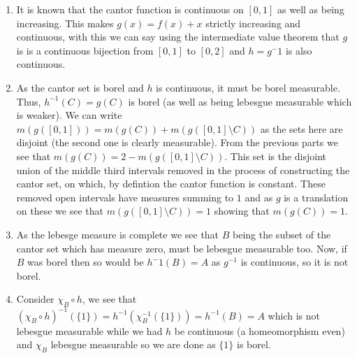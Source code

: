 \documentclass[12pt,a4paper]{article}
\begin{document}
\begin{solution}
\begin{enumerate}[label=\alph*.]
    \item It is known that the cantor function is continuous on $[0,1]$ as well as being increasing. 
    This makes $g(x)=f(x)+x$ strictly increasing and continuous, with this we can say using the intermediate value theorem that $g$ is is a continuous bijection from $[0,1]$ to $[0,2]$ and $h=g^-1$ is also continuous. 
    \item As the cantor set is borel and $h$ is continuous, it must be borel measurable. 
    Thus, $h^{-1}(C)=g(C)$ is borel (as well as being lebesgue measurable which is weaker). 
    We can write $m(g([0,1]))=m(g(C))+m(g([0,1]\setminus C))$ as the sets here are disjoint (the second one is clearly measurable). 
    From the previous parts we see that $m(g(C))=2-m(g([0,1]\setminus C))$. 
    This set is the disjoint union of the middle third intervals removed in the process of constructing the cantor set, on which, by defintion the cantor function is constant. 
    These removed open intervals have measures summing to $1$ and as $g$ is a translation on these we see that $m(g([0,1]\setminus C))=1$ showing that $m(g(C))=1$. 
    \item As the lebesge measure is complete we see that $B$ being the subset of the cantor set which has measure zero, must be lebesgue measurable too. 
    Now, if $B$ was borel then so would be $h^-1(B)=A$ as $g^{-1}$ is continuous, so it is not borel. 
    \item Consider $\chi_{B}\circ h$, we see that $(\chi_B\circ h)^{-1}(\{1\})=h^{-1}(\chi_B^{-1}(\{1\}))=h^{-1}(B)=A$ which is not lebesgue measurable while we had $h$ be continuous (a homeomorphism even) and $\chi_B$ lebesgue measurable so we are done as $\{1\}$ is borel.

\end{enumerate}
\end{solution} 
\end{document}
